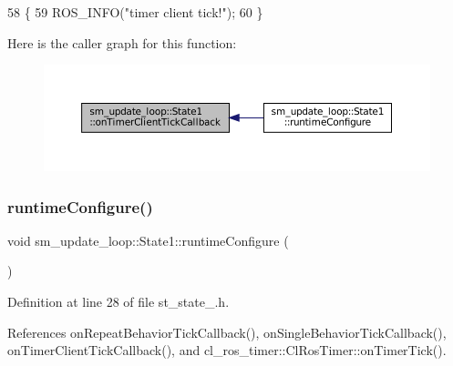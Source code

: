 \begin{DoxyCode}
58     \{
59         ROS\_INFO(\textcolor{stringliteral}{"timer client tick!"});
60     \}
\end{DoxyCode}
Here is the caller graph for this function\+:
\nopagebreak
\begin{figure}[H]
\begin{center}
\leavevmode
\includegraphics[width=350pt]{structsm__update__loop_1_1State1_af132641f3167a2224249c70d072b6574_icgraph}
\end{center}
\end{figure}
\mbox{\label{structsm__update__loop_1_1State1_a9a4c0a2a171bc9c2d7686562000075b4}} 
\subsubsection{\texorpdfstring{runtime\+Configure()}{runtimeConfigure()}}
{\footnotesize\ttfamily void sm\+\_\+update\+\_\+loop\+::\+State1\+::runtime\+Configure (\begin{DoxyParamCaption}{ }\end{DoxyParamCaption})\hspace{0.3cm}{\ttfamily [inline]}}



Definition at line 28 of file st\+\_\+state\+\_.\+h.



References on\+Repeat\+Behavior\+Tick\+Callback(), on\+Single\+Behavior\+Tick\+Callback(), on\+Timer\+Client\+Tick\+Callback(), and cl\+\_\+ros\+\_\+timer\+::\+Cl\+Ros\+Timer\+::on\+Timer\+Tick().


